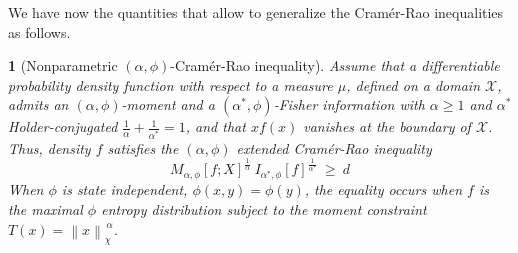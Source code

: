 \documentclass[english,sort&compress]{elsarticle}
\theoremstyle{definition}
\theoremstyle{plain}
\newtheorem{prop}{\protect\propositionname}
\theoremstyle{plain}
\providecommand{\propositionname}{Proposition}
\def\X{\mathcal{X}}
\begin{document}
We  have  now   the  quantities  that  allow  to   generalize  the  Cram\'er-Rao
inequalities as follows.
%
\begin{prop}[Nonparametric                          $(\alpha,\phi)$-Cram\'er-Rao
    inequality] \label{prop:np-phi-CR}
  Assume that  a differentiable probability  density function with respect  to a
  measure $\mu$, defined on a  domain $\X$, admits an $(\alpha,\phi)$-moment and
  a  $(\alpha^*,\phi)$-Fisher information  with  $\alpha \ge  1$ and  $\alpha^*$
  Holder-conjugated  $\frac{1}{\alpha} +  \frac{1}{\alpha^*} =  1$, and  that $x
  f(x)$  vanishes at  the boundary  of $\X$.   Thus, density  $f$  satisfies the
  $(\alpha,\phi)$ extended Cram\'er-Rao inequality
  \begin{equation}\label{eq:np-phi-CR}
   M_{\alpha,\phi}[f;X]^{\frac{1}{\alpha}} \: I_{\alpha^*\!,\phi}[f]^{\frac{1}{\alpha^*}}
   \: \ge \: d
  \end{equation}
  When $\phi$ is  state independent, $\phi(x,y) = \phi(y)$,  the equality occurs
  when  $f$ is the  maximal $\phi$  entropy distribution  subject to  the moment
  constraint $T(x) = \left\| x \right\|_{\chi}^{\, \alpha}$.
\end{prop}
\end{document}

